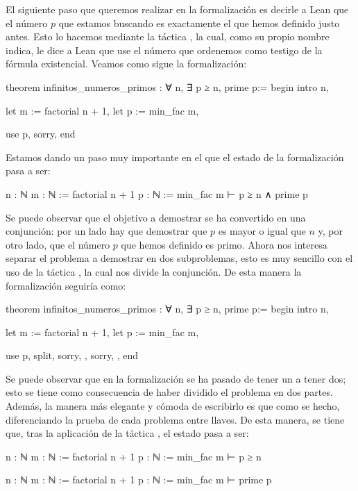 El siguiente paso que queremos realizar en la formalización es decirle a
Lean que el número \(p\) que estamos buscando es exactamente el que
hemos definido justo antes. Esto lo hacemos mediante la táctica
, la cual, como su propio nombre indica, le dice a
Lean que use el número que ordenemos como testigo de la fórmula
existencial. Veamos como sigue la formalización:

\begin{leancode}
theorem infinitos_numeros_primos : ∀ n, ∃ p ≥ n, prime p:=
begin
  intro n,

  let m := factorial n + 1,
  let p := min_fac m,

  use p,
  sorry,
end
\end{leancode}

Estamos dando un paso muy importante en el que el estado de la formalización
pasa a ser:
\begin{leancode}
n : ℕ
m : ℕ := factorial n + 1
p : ℕ := min_fac m
⊢ p ≥ n ∧ prime p
\end{leancode}

Se puede observar que el objetivo a demostrar se ha convertido en una
conjunción: por un lado hay que demostrar que \(p\) es mayor o igual que
\(n\) y, por otro lado, que el número \(p\) que hemos definido es primo. Ahora
nos interesa separar el problema a demostrar en dos subproblemas, esto es
muy sencillo con el uso de la táctica , la cual nos
divide la conjunción. De esta manera la formalización seguiría como:
\begin{leancode}
theorem infinitos_numeros_primos : ∀ n, ∃ p ≥ n, prime p:=
begin
  intro n,

  let m := factorial n + 1,
  let p := min_fac m,

  use p,
  split,
  { sorry, },
  { sorry, },
end
\end{leancode}

Se puede observar que en la formalización se ha pasado de tener un
 a tener dos; esto se tiene como consecuencia de
haber dividido el problema en dos partes. Además, la manera más elegante
y cómoda de escribirlo es que como se hecho, diferenciando la prueba de
cada problema entre llaves. De esta manera, se tiene que, tras la
aplicación de la táctica , el estado pasa a ser:
\begin{leancode}
n : ℕ
m : ℕ := factorial n + 1
p : ℕ := min_fac m
⊢ p ≥ n

n : ℕ
m : ℕ := factorial n + 1
p : ℕ := min_fac m
⊢ prime p
\end{leancode}

